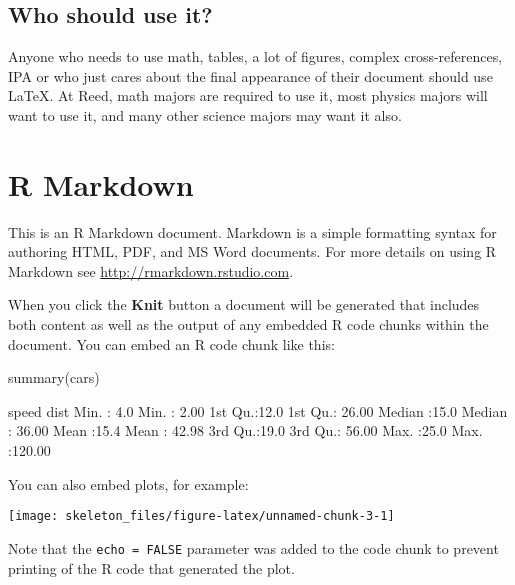 \documentclass[12pt,twoside]{reedthesis}
\begin{document}
\section{Who should use it?}

Anyone who needs to use math, tables, a lot of figures, complex
cross-references, IPA or who just cares about the final appearance of
their document should use \LaTeX. At Reed, math majors are required to
use it, most physics majors will want to use it, and many other science
majors may want it also.

\chapter{R Markdown}

This is an R Markdown document. Markdown is a simple formatting syntax
for authoring HTML, PDF, and MS Word documents. For more details on
using R Markdown see \url{http://rmarkdown.rstudio.com}.

When you click the \textbf{Knit} button a document will be generated
that includes both content as well as the output of any embedded R code
chunks within the document. You can embed an R code chunk like this:

\begin{CodeChunk}
\begin{CodeInput}
summary(cars)
\end{CodeInput}
\begin{CodeOutput}
     speed           dist       
 Min.   : 4.0   Min.   :  2.00  
 1st Qu.:12.0   1st Qu.: 26.00  
 Median :15.0   Median : 36.00  
 Mean   :15.4   Mean   : 42.98  
 3rd Qu.:19.0   3rd Qu.: 56.00  
 Max.   :25.0   Max.   :120.00  
\end{CodeOutput}
\end{CodeChunk}

You can also embed plots, for example:

\begin{CodeChunk}


\begin{center}\texttt{[image: skeleton\_files/figure-latex/unnamed-chunk-3-1]} \end{center}

\end{CodeChunk}

Note that the \texttt{echo = FALSE} parameter was added to the code
chunk to prevent printing of the R code that generated the plot.
\end{document}

